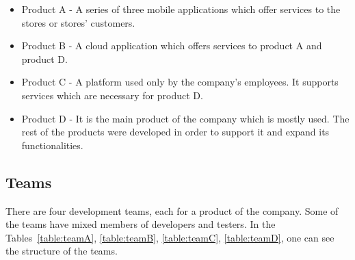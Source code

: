\begin{itemize}
\item Product A - A series of three mobile applications which offer services to the stores or stores' customers.
\item Product B - A cloud application which offers services to product A and product D.
\item Product C - A platform used only by the company's employees. It supports services which are necessary for product D.
\item Product D - It is the main product of the company which is mostly used. The rest of the products were developed in order to support it and expand its functionalities.

\end{itemize}

\subsection{Teams}
There are four development teams, each for a product of the company. Some of the teams have mixed members of developers and testers. In the Tables~\ref{table:teamA}, \ref{table:teamB}, \ref{table:teamC}, \ref{table:teamD}, one can see the structure of the teams. \\

